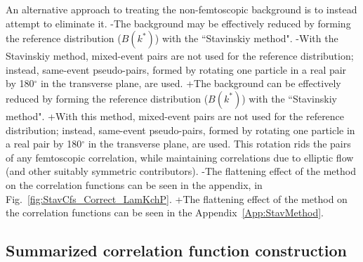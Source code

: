 \begin{table}[htbp]
 
 An alternative approach to treating the non-femtoscopic background is to instead attempt to eliminate it.
-The background may be effectively reduced by forming the reference distribution ($B(k^{*})$) with the ``Stavinskiy method".
-With the Stavinskiy method, mixed-event pairs are not used for the reference distribution; instead, same-event pseudo-pairs, formed by rotating one particle in a real pair by 180$^\circ$ in the transverse plane, are used.  
+The background can be effectively reduced by forming the reference distribution ($B(k^{*})$) with the ``Stavinskiy method".
+With this method, mixed-event pairs are not used for the reference distribution; instead, same-event pseudo-pairs, formed by rotating one particle in a real pair by 180$^\circ$ in the transverse plane, are used.  
 This rotation rids the pairs of any femtoscopic correlation, while maintaining correlations due to elliptic flow (and other suitably symmetric contributors).
-The flattening effect of the method on the \LamKchP correlation functions can be seen in the appendix, in Fig.~\ref{fig:StavCfs_Correct_LamKchP}.
+The flattening effect of the method on the \LamKchP correlation functions can be seen in the Appendix~\ref{App:StavMethod}.
 
 \subsection{Summarized correlation function construction}
 \label{SummarizedFitProcedure}
 

\end{table}
